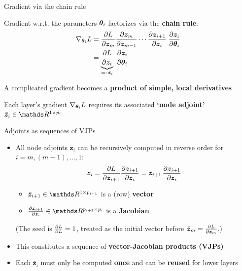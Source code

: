 \documentclass[11pt,compress,t,notes=noshow, xcolor=table]{beamer}
\newcommand{\zv}{\bm{z}}                 %
\newcommand{\adj}[1]{\bar{\bm{z}}_{#1}}  %
\begin{document}
\begin{framei}{Gradient via the chain rule}
\item Gradient w.r.t. the parameters $\bm{\theta}_i$ factorizes via the \textbf{chain rule}:
\begin{align*}
\nabla_{\thetav_i} L &= \pd{L}{\zv_m} \pd{\zv_m}{\zv_{m-1}} \cdots \pd{\zv_{i+1}}{\zv_i} \; \pd{\zv_i}{\thetav_i} \\
&= \underbrace{\pd{L}{\zv_i}}_{=: \, \adj{i}} \; \pd{\zv_i}{\thetav_i}
\end{align*}
\item[$\Rightarrow$] A complicated gradient becomes a \textbf{product of simple, local derivatives}
\item[$\Rightarrow$] Each layer's gradient $\nabla_{\bm{\theta}_i} L$ requires its associated \textbf{`node adjoint'} $\adj{i} \in \R^{1 \times p_i}$
\end{framei}

\begin{framev}{Adjoints as sequences of VJPs}
\begin{itemize}
\item All node adjoints $\adj{i}$ can be recursively computed in reverse order for $i = m, (m-1), \ldots, 1$:
$$
\adj{i} = \pd{L}{\zv_{i+1}} \pd{\zv_{i+1}}{\zv_i} = \adj{i+1} \, \pd{\zv_{i+1}}{\zv_i}
$$
\begin{itemize}
  \item $\adj{i+1} \in \R^{1 \times p_{i+1}}$ is a (row) \textbf{vector}
  \item $\pd{\zv_{i+1}}{\zv_i} \in \R^{p_{i+1} \times p_i}$ is a \textbf{Jacobian}
\end{itemize}
{\footnotesize(The seed is $\frac{\partial{L}}{\partial L} = 1$, treated as the initial vector before $\adj{m} = \pd{L}{\zv_m}$.)}
\item[$\Rightarrow$] This constitutes a sequence of \textbf{vector-Jacobian products (VJPs)}
\item[$\Rightarrow$] Each $\adj{i}$ must only be computed \textbf{once} and can be \textbf{reused} for lower layers
\end{itemize}
\end{framev}
\end{document}
